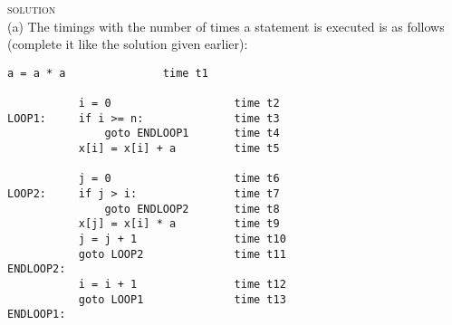 
\newpage
\textsc{solution}\\
(a) 
The timings with the number of times a statement is executed
is as follows (complete it like the solution given earlier):
\begin{Verbatim}[frame=single,commandchars]
           a = a * a               time t1

           i = 0                   time t2
LOOP1:     if i >= n:              time t3
               goto ENDLOOP1       time t4
           x[i] = x[i] + a         time t5

           j = 0                   time t6
LOOP2:     if j > i:               time t7
               goto ENDLOOP2       time t8
           x[j] = x[i] * a         time t9
           j = j + 1               time t10
           goto LOOP2              time t11
ENDLOOP2:
           i = i + 1               time t12
           goto LOOP1              time t13
ENDLOOP1:
\end{Verbatim}
